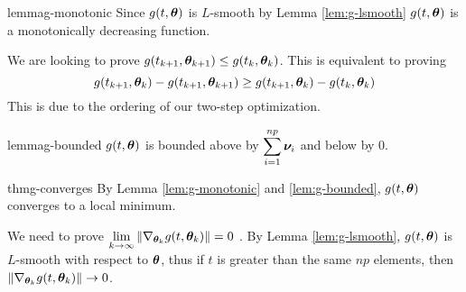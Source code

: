 \documentclass{article} %
\newenvironment{proofsketch}{%
	\renewcommand{\proofname}{Proof Sketch}\proof}{\endproof}
\newcommand{\norm}[1]{\left\lVert#1\right\rVert}
\begin{document}
	\begin{restatable}{lemma}{g-monotonic}
		\label{lem:g-monotonic}
		Since $g(t,{\bm{\theta}})$ is $L$-smooth by Lemma \ref{lem:g-lsmooth} $g(t,{\bm{\theta}})$ is a monotonically decreasing function. 
	\end{restatable}
	\begin{proofsketch}
		We are looking to prove $g(t_{k+1},{\bm{\theta}}_{k+1}) \leq g(t_k,{\bm{\theta}}_k)$. This is equivalent to proving \vspace{1em}
		\begin{equation}
			g(t_{k+1},{\bm{\theta}}_k) - g(t_{k+1},{\bm{\theta}}_{k+1}) \geq g(t_{k+1},{\bm{\theta}}_k) - g(t_k,{\bm{\theta}}_k)
		\end{equation} 
		This is due to the ordering of our two-step optimization.
	\end{proofsketch}
	
	\begin{restatable}{lemma}{g-bounded}
		\label{lem:g-bounded}
		$g(t,{\bm{\theta}})$ is bounded above by $\displaystyle \sum_{i=1}^{np}{\bm{\nu}}_i$ and below by $0$.
	\end{restatable}
	
	\begin{restatable}{thm}{g-converges}
		\label{thm:g-converges}
		By Lemma \ref{lem:g-monotonic} and \ref{lem:g-bounded}, $g(t,{\bm{\theta}})$ converges to a local minimum.
	\end{restatable}
	\begin{proofsketch}
		We need to prove $\displaystyle \lim_{k\to\infty} \norm{\nabla_{\vtheta_k}g(t,\vtheta_k)} = 0$ . By Lemma \ref{lem:g-lsmooth}, $g(t,{\bm{\theta}})$ is $L$-smooth with respect to ${\bm{\theta}}$, thus if $t$ is greater than the same $np$ elements, then $\norm{\nabla_{\vtheta_k}g(t,\vtheta_k)} \to 0$. 
	\end{proofsketch}
\end{document}
